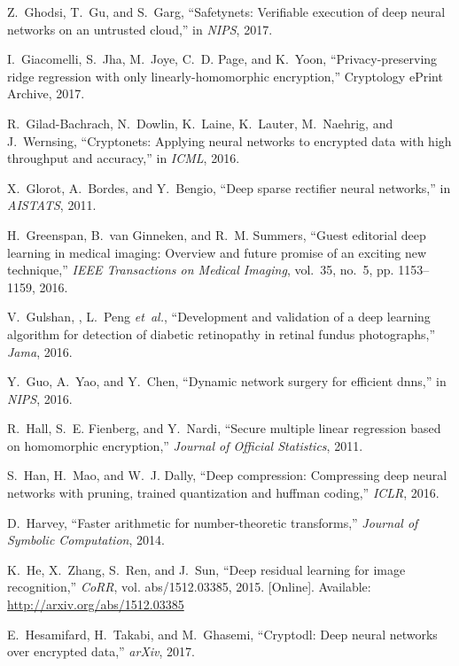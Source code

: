\documentclass[conference]{IEEEtran}
\begin{document}
\begin{thebibliography}{10}
Z.~Ghodsi, T.~Gu, and S.~Garg, ``Safetynets: Verifiable execution of deep
  neural networks on an untrusted cloud,'' in \emph{NIPS}, 2017.

I.~Giacomelli, S.~Jha, M.~Joye, C.~D. Page, and K.~Yoon, ``Privacy-preserving
  ridge regression with only linearly-homomorphic encryption,'' Cryptology
  ePrint Archive, 2017.

R.~Gilad-Bachrach, N.~Dowlin, K.~Laine, K.~Lauter, M.~Naehrig, and J.~Wernsing,
  ``Cryptonets: Applying neural networks to encrypted data with high throughput
  and accuracy,'' in \emph{ICML}, 2016.

X.~Glorot, A.~Bordes, and Y.~Bengio, ``Deep sparse rectifier neural networks,''
  in \emph{{AISTATS}}, 2011.

H.~Greenspan, B.~van Ginneken, and R.~M. Summers, ``Guest editorial deep
  learning in medical imaging: Overview and future promise of an exciting new
  technique,'' \emph{IEEE Transactions on Medical Imaging}, vol.~35, no.~5, pp.
  1153--1159, 2016.

V.~Gulshan, , L.~Peng \emph{et~al.}, ``Development and validation of a deep
  learning algorithm for detection of diabetic retinopathy in retinal fundus
  photographs,'' \emph{Jama}, 2016.

Y.~Guo, A.~Yao, and Y.~Chen, ``Dynamic network surgery for efficient dnns,'' in
  \emph{NIPS}, 2016.

R.~Hall, S.~E. Fienberg, and Y.~Nardi, ``Secure multiple linear regression
  based on homomorphic encryption,'' \emph{Journal of Official Statistics},
  2011.

S.~Han, H.~Mao, and W.~J. Dally, ``Deep compression: Compressing deep neural
  networks with pruning, trained quantization and huffman coding,''
  \emph{ICLR}, 2016.

D.~Harvey, ``Faster arithmetic for number-theoretic transforms,'' \emph{Journal
  of Symbolic Computation}, 2014.

\BIBentryALTinterwordspacing
K.~He, X.~Zhang, S.~Ren, and J.~Sun, ``Deep residual learning for image
  recognition,'' \emph{CoRR}, vol. abs/1512.03385, 2015. [Online]. Available:
  \url{http://arxiv.org/abs/1512.03385}
\BIBentrySTDinterwordspacing

E.~Hesamifard, H.~Takabi, and M.~Ghasemi, ``Cryptodl: Deep neural networks over
  encrypted data,'' \emph{arXiv}, 2017.


\end{thebibliography}
\end{document}
